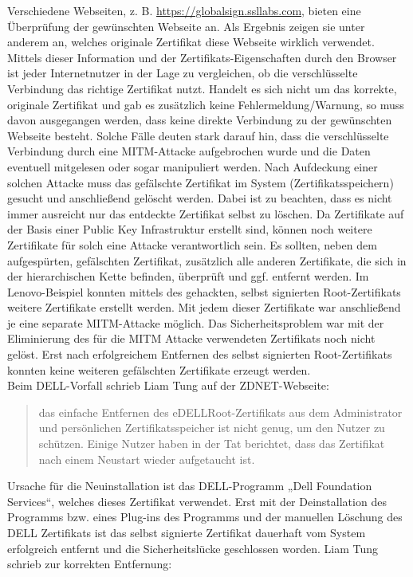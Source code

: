 \noindent
Verschiedene Webseiten, z. B. \url{https://globalsign.ssllabs.com}, bieten eine Überprüfung der gewünschten Webseite an. Als Ergebnis zeigen sie unter anderem an, welches originale Zertifikat diese Webseite wirklich verwendet. Mittels dieser Information und der Zertifikats-Eigenschaften durch den Browser ist jeder Internetnutzer in der Lage zu vergleichen, ob die verschlüsselte Verbindung das richtige Zertifikat nutzt. Handelt es sich nicht um das korrekte, originale Zertifikat und gab es zusätzlich keine Fehlermeldung/Warnung, so muss davon ausgegangen werden, dass keine direkte Verbindung zu der gewünschten Webseite besteht. Solche Fälle deuten stark darauf hin, dass die verschlüsselte Verbindung durch eine MITM-Attacke aufgebrochen wurde und die Daten eventuell mitgelesen oder sogar manipuliert werden. Nach Aufdeckung einer solchen Attacke muss das gefälschte Zertifikat im System (Zertifikatsspeichern) gesucht und anschließend gelöscht werden. Dabei ist zu beachten, dass es nicht immer ausreicht nur das entdeckte Zertifikat selbst zu löschen. Da Zertifikate auf der Basis einer Public Key Infrastruktur \cite[vgl.]{x.509} erstellt sind, können noch weitere Zertifikate für solch eine Attacke verantwortlich sein. Es sollten, neben dem aufgespürten, gefälschten Zertifikat, zusätzlich alle anderen Zertifikate, die sich in der hierarchischen Kette befinden, überprüft und ggf. entfernt werden. Im Lenovo-Beispiel konnten mittels des gehackten, selbst signierten Root-Zertifikats weitere Zertifikate erstellt werden. Mit jedem dieser Zertifikate war anschließend je eine separate MITM-Attacke möglich. Das Sicherheitsproblem war mit der Eliminierung des für die MITM Attacke verwendeten Zertifikats noch nicht gelöst. Erst nach erfolgreichem Entfernen des selbst signierten Root-Zertifikats konnten keine weiteren gefälschten Zertifikate erzeugt werden.\\
Beim DELL-Vorfall schrieb Liam Tung auf der ZDNET-Webseite: 
\begin{quote}
	\glqq [...] das einfache Entfernen des eDELLRoot-Zertifikats aus dem Administrator und persönlichen Zertifikatsspeicher ist nicht genug, um den Nutzer zu schützen. Einige Nutzer haben in der Tat berichtet, dass das Zertifikat nach einem Neustart wieder aufgetaucht ist.\grqq \cite{zdnet}	
\end{quote}
Ursache für die Neuinstallation ist das DELL-Programm „Dell Foundation Services“, welches dieses Zertifikat verwendet. Erst mit der Deinstallation des Programms bzw. eines Plug-ins des Programms und der manuellen Löschung des DELL Zertifikats ist das selbst signierte Zertifikat dauerhaft vom System erfolgreich entfernt und die Sicherheitslücke geschlossen worden. Liam Tung schrieb zur korrekten Entfernung: 
